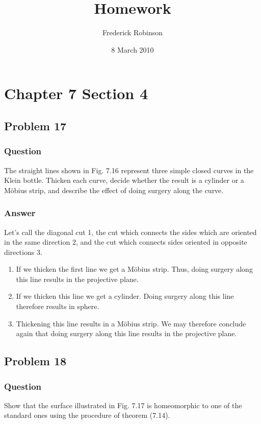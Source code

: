 \documentclass[10pt]{article}
\title{Homework}
\author{Frederick Robinson}
\date{8 March 2010}
\begin{document}

   \maketitle



\section{Chapter 7 Section 4}

\subsection{Problem 17}

\subsubsection{Question}
The straight lines shown in Fig. 7.16 represent three simple closed curves in the Klein bottle. Thicken each curve, decide whether the result is a cylinder or a M\"{o}bius strip, and describe the effect of doing surgery along the curve.
\subsubsection{Answer}
Let's call the diagonal cut 1, the cut which connects the sides which are oriented in the same direction 2, and the cut which connects sides oriented in opposite directions 3.

\begin{enumerate}
\item If we thicken the first line we get a M\"{o}bius strip. Thus, doing surgery along this line results in the projective plane.
\item If we thicken this line we get a cylinder. Doing surgery along this line therefore results in sphere.
\item Thickening this line results in a M\"{o}bius strip. We may therefore conclude again that  doing surgery along this line results in the projective plane.
\end{enumerate}

\subsection{Problem 18}

\subsubsection{Question}
Show that the surface illustrated in Fig. 7.17 is homeomorphic to one of the standard ones using the procedure of theorem (7.14).
\end{document}
